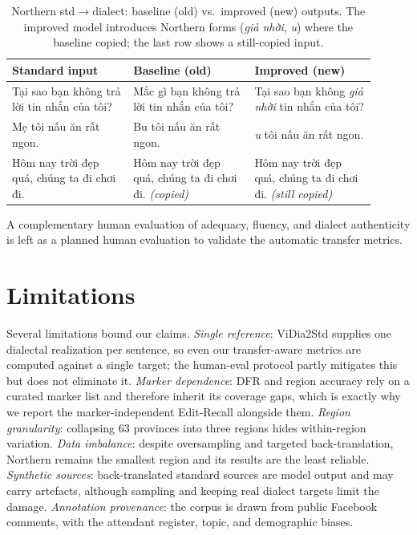 \documentclass[11pt]{article}
\begin{document}
\begin{table}[t]
  \centering
  \footnotesize
  \caption{Northern std$\rightarrow$dialect: baseline (old) vs.\ improved (new)
  outputs. The improved model introduces Northern forms (\emph{giả nhời},
  \emph{u}) where the baseline copied; the last row shows a still-copied input.}
  \label{tab:qual}
  \begin{tabular}{p{0.30\linewidth} p{0.30\linewidth} p{0.30\linewidth}}
    \toprule
    \textbf{Standard input} & \textbf{Baseline (old)} & \textbf{Improved (new)}\\
    \midrule
    Tại sao bạn không trả lời tin nhắn của tôi?
      & Mắc gì bạn không trả lời tin nhắn của tôi?
      & Tại sao bạn không \emph{giả nhời} tin nhắn của tôi?\\
    Mẹ tôi nấu ăn rất ngon.
      & Bu tôi nấu ăn rất ngon.
      & \emph{u} tôi nấu ăn rất ngon.\\
    Hôm nay trời đẹp quá, chúng ta đi chơi đi.
      & Hôm nay trời đẹp quá, chúng ta đi chơi đi. \emph{(copied)}
      & Hôm nay trời đẹp quá, chúng ta đi chơi đi. \emph{(still copied)}\\
    \bottomrule
  \end{tabular}
\end{table}

A complementary human evaluation of adequacy, fluency, and dialect authenticity
is left as a planned human evaluation to validate the automatic transfer metrics.

\section{Limitations}
\label{sec:limitations}

Several limitations bound our claims. \emph{Single reference}: ViDia2Std supplies
one dialectal realization per sentence, so even our transfer-aware metrics are
computed against a single target; the human-eval protocol partly mitigates this but
does not eliminate it. \emph{Marker dependence}: DFR and region accuracy rely on a
curated marker list and therefore inherit its coverage gaps, which is exactly why
we report the marker-independent Edit-Recall alongside them. \emph{Region
granularity}: collapsing 63 provinces into three regions hides within-region
variation. \emph{Data imbalance}: despite oversampling and targeted
back-translation, Northern remains the smallest region and its results are the
least reliable. \emph{Synthetic sources}: back-translated standard sources are
model output and may carry artefacts, although sampling and keeping real dialect
targets limit the damage. \emph{Annotation provenance}: the corpus is drawn from
public Facebook comments, with the attendant register, topic, and demographic
biases.
\end{document}
